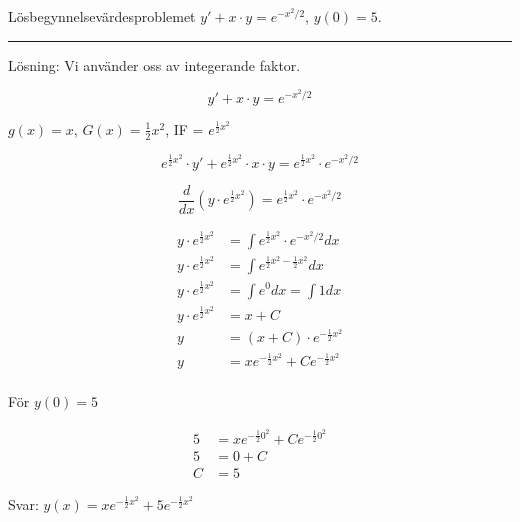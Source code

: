 \documentclass[11pt]{article}
\begin{document}
Lösbegynnelsevärdesproblemet $y' + x \cdot y = e^{-x^2 / 2}$, $y(0) = 5$.

\noindent\rule{\textwidth}{0.5pt}


Lösning: Vi använder oss av integerande faktor.

\begin{equation}
    y' + x \cdot y = e^{-x^2 / 2}
\end{equation}

$g(x) = x$, $G(x) = \frac{1}{2}x^2$, IF = $e^{\frac{1}{2}x^2}$

\begin{equation}
    e^{\frac{1}{2}x^2} \cdot y' + e^{\frac{1}{2}x^2} \cdot x \cdot y = e^{\frac{1}{2}x^2} \cdot e^{-x^2 / 2}
\end{equation}

\begin{equation}
    \frac{d}{dx}\left(y \cdot e^{\frac{1}{2}x^2}\right) = e^{\frac{1}{2}x^2} \cdot e^{-x^2 / 2}
\end{equation}

\begin{align}
    y \cdot e^{\frac{1}{2}x^2} &= \int e^{\frac{1}{2}x^2} \cdot e^{-x^2 / 2} dx\\
    y \cdot e^{\frac{1}{2}x^2} &= \int e^{\frac{1}{2}x^2  - \frac{1}{2}x^2} dx \\
    y \cdot e^{\frac{1}{2}x^2} &= \int e^0 dx = \int 1 dx \\
    y \cdot e^{\frac{1}{2}x^2} &= x + C\\
    y &= (x + C) \cdot e^{-\frac{1}{2}x^2} \\
    y &= xe^{-\frac{1}{2}x^2} + Ce^{-\frac{1}{2}x^2} \\
\end{align}

För $y(0) = 5$

\begin{align}
    5 &= xe^{-\frac{1}{2}0^2} + Ce^{-\frac{1}{2}0^2} \\
    5 &= 0 + C \\
    C &= 5
\end{align}

Svar: $y(x) = xe^{-\frac{1}{2}x^2} + 5e^{-\frac{1}{2}x^2}$
\end{document}
